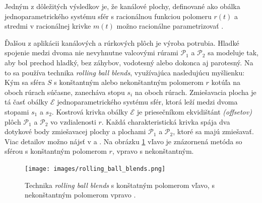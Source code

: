 Jedným z dôležitých výsledkov je, že kanálové plochy, definované ako obálka jednoparametrického systému sfér s racionálnou funkciou polomeru $r(t)$ a stredmi v racionálnej krivke $m(t)$ možno racionálne parametrizovať \cite{Pet97}.


Ďalšou z aplikácii kanálových a rúrkových plôch je výroba potrubia. Hladké spojenie medzi dvoma nie nevyhnutne valcovými rúrami $\mathcal{P}_1$ a $\mathcal{P}_2$ sa modeluje tak, aby bol prechod hladký, bez záhybov, vodotesný alebo dokonca aj parotesný. Na to sa používa technika \textit{rolling ball blends}, využívajúca nasledujúcu myšlienku: Kým sa sféra $S$ s konštantným alebo nekonštantným polomerom $r$ kotúľa na oboch rúrach súčasne, zanecháva stopu $s_i$ na oboch rúrach. Zmiešavacia plocha je tá časť obálky $\mathcal{E}$ jednoparametrického systému sfér, ktorá leží medzi dvoma stopami $s_1$ a $s_2$. Kostrová krivka obálky $\mathcal{E}$ je priesečníkom ekvidištánt \textit{(offsetov)} plôch $\mathcal{P}_1$ a $\mathcal{P}_2$ vo vzdialenosti $r$. Každá charakteristická krivka spája dva dotykové body zmiešavacej plochy a plochami $\mathcal{P}_1$ a $\mathcal{P}_2$, ktoré sa majú zmiešavať. Viac detailov možno nájsť v \cite{Kar00} a \cite{Ode20}. Na obrázku \ref{fig:rolling_ball_blends} vľavo je znázornená metóda so sférou s konštantným polomerom $r$, vpravo s nekonštantným.

\begin{figure}[h]
	\centering
	\texttt{[image: images/rolling\_ball\_blends.png]}
	\caption[Technika rolling ball blends.]{Technika \textit{rolling ball blends} s konštatným polomerom vľavo, s nekonštantným polomerom vpravo \cite{Rollingballblends}.}
	\label{fig:rolling_ball_blends}
\end{figure}
